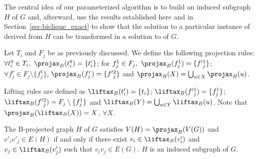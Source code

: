 The central idea of our parameterized algorithm is to build an induced subgraph $H$ of $G$ and, afterward, use the results established here and in Section~\ref{sec:biclique_exact} to show that the solution to a particular instance of  derived from $H$ can be transformed in a solution to  of $G$.


\begin{definition}
    Let $T_i$ and $F_j$ be as previously discussed.
    We define the following projection rules:
    $\forall t_i^q \in T_i,\ \Proj{B}(t_i^q) = \{t'_i\}$;
    for $f_j^1\in F_j,\ \Proj{B}(f_j^1) = \{f'{_j^1}\}$;
    $\forall f_j^r \in F_j \setminus \{f_j^1\}$, $\Proj{B}(f_j^r) = \{f'{_j^2}\}$
    and $\Proj{B}(X) = \bigcup_{u \in X} \Proj{B}(u)$.
    
    Lifting rules are defined as $\Lift{B}(t'_i) = \{t_i\}$; $\Lift{B}(f'{_j^1}) = \{f_j^1\}$; $\Lift{B}(f'{_j^2}) = F_j \setminus \{f_j^1\}$ and $\Lift{B}(Y) = \bigcup_{u \in Y} \Lift{B}(u)$. Note that $\Proj{B}(\Lift{B}(X)) = X$, $\forall X$.
\end{definition}


\begin{definition}
    The B-projected graph $H$ of $G$ satisfies $V(H) = \Proj{B}(V(G))$ and $v'_iv'_j \in E(H)$ if and only if there exist $v_i \in \Lift{B}(v'_i)$ and $v_j \in \Lift{B}(v'_j)$ such that $v_iv_j \in E(G)$. $H$ is an induced subgraph of $G$.
\end{definition}

